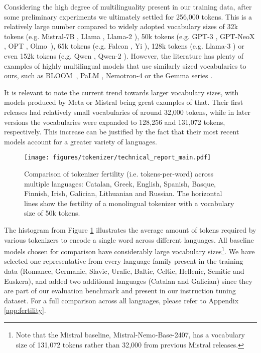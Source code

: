 Considering the high degree of multilinguality present in our training data, after some preliminary experiments we ultimately settled for 256,000 tokens. This is a relatively large number compared to widely adopted vocabulary sizes of 32k tokens (e.g. Mistral-7B \cite{mistral}, Llama \cite{llama1}, Llama-2 \cite{llama2}), 50k tokens (e.g. GPT-3 \cite{gpt3}, GPT-NeoX \cite{gptneox}, OPT \cite{opt}, \mbox{Olmo \cite{olmo}}), 65k tokens (e.g. Falcon \cite{falcon}, Yi \cite{yi}), 128k tokens (e.g. Llama-3 \cite{llama3}) or even 152k tokens (e.g. Qwen \cite{qwen1}, Qwen-2 \cite{qwen2}). However, the literature has plenty of examples of highly multilingual models that use similarly sized vocabularies to ours, such as \mbox{BLOOM \cite{bloom}}, PaLM \cite{palm}, Nemotron-4 \cite{nemotron4} or the Gemma series \cite{gemma,gemma2}.


It is relevant to note the current trend towards larger vocabulary sizes, with models produced by Meta or Mistral being great examples of that. Their first releases had relatively small vocabularies of around 32,000 tokens, while in later versions the vocabularies were expanded to 128,256 and 131,072 tokens, respectively. This increase can be justified by the fact that their most recent models account for a greater variety of languages.

\begin{figure}[htbp]
    \centering
    \texttt{[image: figures/tokenizer/technical\_report\_main.pdf]}
    \caption{Comparison of tokenizer fertility (i.e. tokens-per-word) across multiple languages: Catalan, Greek, English, Spanish, Basque, Finnish, Irish, Galician, Lithuanian and Russian. The horizontal lines show the fertility of a monolingual tokenizer with a vocabulary size of 50k tokens.}
    \label{fig:fertility_plot}
\end{figure}

The histogram from Figure \ref{fig:fertility_plot} illustrates the average amount of tokens required by various tokenizers to encode a single word across different languages. All baseline models chosen for comparison have considerably large vocabulary sizes\footnote{Note that the Mistral baseline, Mistral-Nemo-Base-2407, has a vocabulary size of 131,072 tokens rather than 32,000 from previous Mistral releases.}. We have selected one representative from every language family present in the training data (Romance, Germanic, Slavic, Uralic, Baltic, Celtic, Hellenic, Semitic and Euskera), and added two additional languages (Catalan and Galician) since they are part of our evaluation benchmark and present in our instruction tuning dataset. For a full comparison across all languages, please refer to Appendix \ref{app:fertility}.

